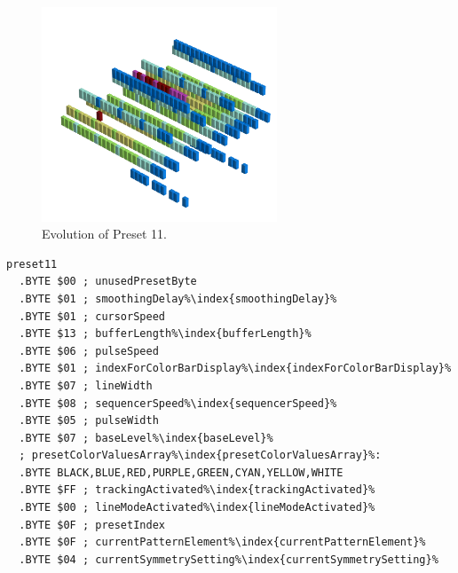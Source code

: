 \clearpage
\begin{minipage}[b]{0.48\linewidth}
\begin{figure}[H]                                                          
  \centering                                                             
  \begin{adjustbox}{width=7cm,center}                                   
  \includegraphics[width=7cm]{src/presets/pattern11-45.png}%
  \end{adjustbox}                                                        
\caption{Evolution of Preset 11.}                                           
\end{figure}                                                               
                                                                 
                                                                           
\end{minipage}
\hspace{0.1cm}
\begin{minipage}[b]{0.48\linewidth}                                       
\begin{lstlisting}[basicstyle=\ttfamily\scriptsize,caption=Data structure for Preset 11.,escapechar=\%]
preset11
  .BYTE $00 ; unusedPresetByte
  .BYTE $01 ; smoothingDelay%\index{smoothingDelay}%
  .BYTE $01 ; cursorSpeed
  .BYTE $13 ; bufferLength%\index{bufferLength}%
  .BYTE $06 ; pulseSpeed
  .BYTE $01 ; indexForColorBarDisplay%\index{indexForColorBarDisplay}%
  .BYTE $07 ; lineWidth
  .BYTE $08 ; sequencerSpeed%\index{sequencerSpeed}%
  .BYTE $05 ; pulseWidth
  .BYTE $07 ; baseLevel%\index{baseLevel}%
  ; presetColorValuesArray%\index{presetColorValuesArray}%: 
  .BYTE BLACK,BLUE,RED,PURPLE,GREEN,CYAN,YELLOW,WHITE
  .BYTE $FF ; trackingActivated%\index{trackingActivated}%
  .BYTE $00 ; lineModeActivated%\index{lineModeActivated}%
  .BYTE $0F ; presetIndex
  .BYTE $0F ; currentPatternElement%\index{currentPatternElement}%
  .BYTE $04 ; currentSymmetrySetting%\index{currentSymmetrySetting}%
\end{lstlisting}
\end{minipage}

